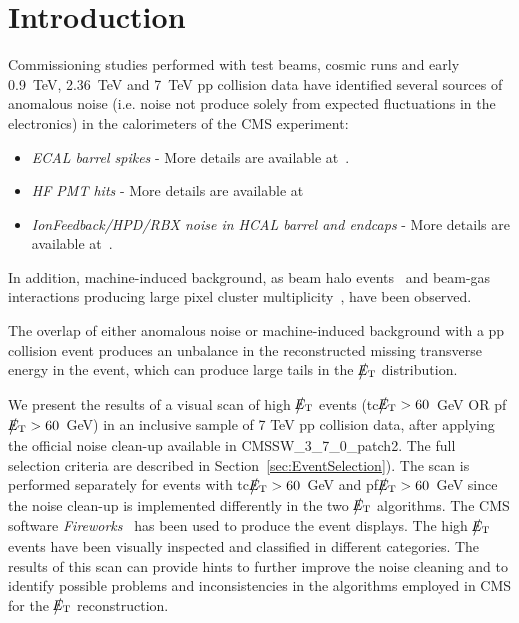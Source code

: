 \section{Introduction}

Commissioning studies performed with test beams, cosmic runs and 
early 0.9~TeV, 2.36~TeV and 7~TeV pp 
collision data have identified several sources of anomalous noise 
(i.e. noise not produce solely from expected fluctuations in the electronics)
in the calorimeters of the CMS experiment:
\begin{itemize}
\item {\it ECAL barrel spikes} - More details are available at~\cite{ECALAt7TeV}.

\item {\it HF PMT hits} - More details are available at~\cite{Chatrchyan:1225105,HFDN}

\item {\it IonFeedback/HPD/RBX noise in HCAL barrel and endcaps} - More details are available at~\cite{Chatrchyan:1225105,HCALWGNOTE}.
\end{itemize}
In addition, machine-induced background, as beam halo events~\cite{BEAMHALONOTE} 
and beam-gas interactions producing large pixel cluster multiplicity~\cite{TRKPAS2010}, have been observed. 

The overlap of either anomalous noise or machine-induced background 
with a pp collision event produces an unbalance in 
the reconstructed missing transverse energy in the event, which can produce 
large tails in the $\big\slash\hspace{-1.6ex}{E_\text{T}}$ distribution. 

We present the results of a visual scan of high $\big\slash\hspace{-1.6ex}{E_\text{T}}$ events 
(tc$\big\slash\hspace{-1.6ex}{E_\text{T}}>60$~GeV OR pf$\big\slash\hspace{-1.6ex}{E_\text{T}}>60$~GeV)
in an inclusive sample of 7 TeV pp collision data, 
after applying the official noise clean-up available in CMSSW\_3\_7\_0\_patch2.
The full selection criteria are described in Section~\ref{sec:EventSelection}). 
The scan is performed separately for events with tc$\big\slash\hspace{-1.6ex}{E_\text{T}}>60$~GeV and pf$\big\slash\hspace{-1.6ex}{E_\text{T}}>60$~GeV
since the noise clean-up is implemented differently in the two $\big\slash\hspace{-1.6ex}{E_\text{T}}$ algorithms.
The CMS software {\it Fireworks}~\cite{FireworksLink} has been used to produce the event displays. 
The high $\big\slash\hspace{-1.6ex}{E_\text{T}}$ events have been visually inspected and classified in different 
categories. The results of this scan can provide hints to further improve the noise 
cleaning and to identify possible problems and inconsistencies in the algorithms employed 
in CMS for the $\big\slash\hspace{-1.6ex}{E_\text{T}}$ reconstruction.

